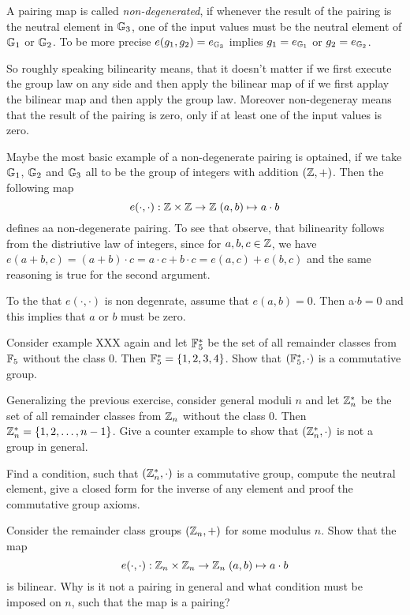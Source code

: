 A pairing map is called \textit{non-degenerated}, if whenever the result of the pairing is the neutral element in $\mathbb{G}_3$, one of the input values must be the neutral element of $\mathbb{G}_1$ or $\mathbb{G}_2$. To be more precise $e(g_1,g_2)=e_{\mathbb{G}_3}$ implies $g_1=e_{\mathbb{G}_1}$ or $g_2=e_{\mathbb{G}_2}$.

So roughly speaking bilinearity means, that it doesn't matter if we first execute the group law on any side and then apply the bilinear map of if we first applay the bilinear map and then apply the group law. Moreover non-degeneray means that the result of the pairing is zero, only if at least one of the input values is zero.
\begin{example}Maybe the most basic example of a non-degenerate pairing is optained, if we take $\mathbb{G}_1$, $\mathbb{G}_2$ and $\mathbb{G}_3$ all to be the group of integers with addition $(\mathbb{Z},+)$. Then the following map 
$$
e(\cdot,\cdot): \mathbb{Z} \times \mathbb{Z} \to \mathbb{Z} \; (a,b)\mapsto a\cdot b
$$
defines aa non-degenerate pairing. To see that observe, that bilinearity follows from the distriutive law of integers, since for $a,b,c\in \mathbb{Z}$, we have $e(a+b,c)=(a+b)\cdot c = a\cdot c + b\cdot c = e(a,c)+ e(b,c)$ and the same reasoning is true for the second argument.

To the that $e(\cdot,\cdot)$ is non degenrate, assume that $e(a,b)=0$. Then a$\cdot b =0$ and this implies that $a$ or $b$ must be zero.
\end{example} 

\begin{exercise} Consider example XXX again and let $\mathbb{F}_5^*$ be the set of all remainder classes from $\mathbb{F}_5$ without the class $0$. Then $\mathbb{F}_5^*=\{1,2,3,4\}$. Show that $(\mathbb{F}_5^*,\cdot)$ is a commutative group. 
\end{exercise}
\begin{exercise} Generalizing the previous exercise, consider general moduli $n$ and let $\mathbb{Z}_n^*$ be the set of all remainder classes from $\mathbb{Z}_n$ without the class $0$. Then $\mathbb{Z}_n^*=\{1,2,\ldots,n-1\}$. Give a counter example to show that $(\mathbb{Z}^*_n,\cdot)$ is not a group in general. 

Find a condition, such that $(\mathbb{Z}^*_n,\cdot)$ is a commutative group, compute the neutral element, give a closed form for the inverse of any element and proof the commutative group axioms.
\end{exercise}
\begin{exercise} Consider the remainder class groups $(\mathbb{Z}_n,+)$ for some modulus $n$. Show that the map
$$
e(\cdot,\cdot): \mathbb{Z}_n \times \mathbb{Z}_n \to \mathbb{Z}_n \; (a,b)\mapsto a\cdot b
$$
is bilinear. Why is it not a pairing in general and what condition must be imposed on $n$, such that the map is a pairing?
\end{exercise}

